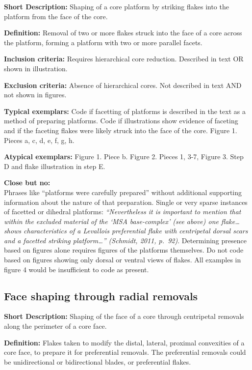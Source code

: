 \documentclass[
]{article}
\begin{document}
\textbf{Short Description:} Shaping of a core platform by striking
flakes into the platform from the face of the core.

\textbf{Definition:} Removal of two or more flakes struck into the face
of a core across the platform, forming a platform with two or more
parallel facets.

\textbf{Inclusion criteria:} Requires hierarchical core reduction.
Described in text OR shown in illustration.

\textbf{Exclusion criteria:} Absence of hierarchical cores. Not
described in text AND not shown in figures.

\textbf{Typical exemplars:} Code if facetting of platforms is described
in the text as a method of preparing platforms. Code if illustrations
show evidence of faceting and if the faceting flakes were likely struck
into the face of the core. Figure 1. Pieces a, c, d, e, f, g, h.

\textbf{Atypical exemplars:} Figure 1. Piece b. Figure 2. Pieces 1, 3-7,
Figure 3. Step D and flake illustration in step E.

\textbf{Close but no:}\\
Phrases like ``platforms were carefully prepared'' without additional
supporting information about the nature of that preparation. Single or
very sparse instances of facetted or dihedral platforms:
\emph{``Nevertheless it is important to mention that within the excluded
material of the `MSA base-complex' (see above) one flake\ldots{} shows
characteristics of a Levallois preferential flake with centripetal
dorsal scars and a facetted striking platform\ldots{}'' (Schmidt, 2011,
p.~92)}. Determining presence based on figures alone requires figures of
the platforms themselves. Do not code based on figures showing only
dorsal or ventral views of flakes. All examples in figure 4 would be
insufficient to code as present.

\hypertarget{face-shaping-through-radial-removals}{%
\subsection{Face shaping through radial
removals}\label{face-shaping-through-radial-removals}}

\textbf{Short Description:} Shaping of the face of a core through
centripetal removals along the perimeter of a core face.

\textbf{Definition:} Flakes taken to modify the distal, lateral,
proximal convexities of a core face, to prepare it for preferential
removals. The preferential removals could be unidirectional or
bidirectional blades, or preferential flakes.
\end{document}
